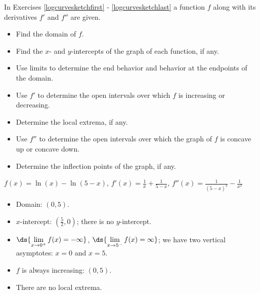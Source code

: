 \documentclass{ximera}
\begin{document}
\begin{question}
In Exercises \ref{logcurvesketchfirst}  - \ref{logcurvesketchlast} a function $f$ along with its derivatives $f'$ and $f''$ are given.

\begin{itemize}

\item  Find the domain of $f$.

\item  Find the $x$- and $y$-intercepts of the graph of each function, if any.

\item  Use limits to determine the end behavior and behavior at the endpoints of the domain.

\item  Use $f'$ to determine the open intervals over which $f$ is increasing or decreasing.

\item Determine the local extrema, if any.

\item  Use $f''$ to determine the open intervals over which the graph of $f$  is concave up or concave down.

\item  Determine the inflection points of the graph, if any.

\end{itemize}

\begin{problem}\label{logcurvesketchfirst}

$f(x) = \ln(x) - \ln(5-x)$,  $f'(x) = \frac{1}{x} + \frac{1}{5-x}$, $f''(x) = \frac{1}{(5-x)^2} - \frac{1}{x^2}$

\begin{solution}
\begin{itemize}  \item  Domain:  $(0, 5)$.

\item $x$-intercept:  $\left( \frac{5}{2}, 0\right)$;  there is no $y$-intercept.

\item $\ds{\lim_{x \rightarrow 0^{+}} f(x) = -\infty}$, $\ds{\lim_{x \rightarrow 5^{-}} f(x) = \infty}$;  we have two vertical asymptotes:  $x = 0$ and $x = 5$.

\item  $f$ is always increasing: $(0, 5)$.

\item There are no local extrema.


\end{itemize}
\end{solution}
\end{problem}
\end{question}
\end{document}
